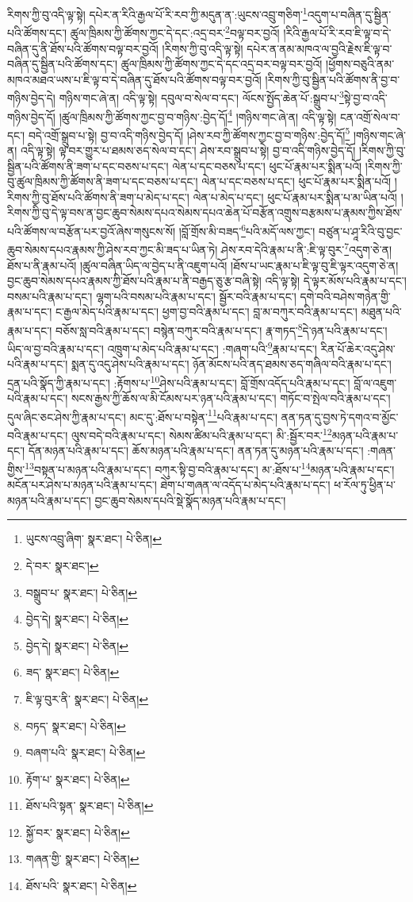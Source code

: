 རིགས་ཀྱི་བུ་འདི་ལྟ་སྟེ། དཔེར་ན་རིའི་རྒྱལ་པོ་རི་རབ་ཀྱི་མདུན་ན་:ཡུངས་འབྲུ་གཅིག་\footnote{ཡུངས་འབྲུ་ཞིག་  སྣར་ཐང་།  པེ་ཅིན། }འདུག་པ་བཞིན་དུ་སྦྱིན་པའི་ཚོགས་དང་། ཚུལ་ཁྲིམས་ཀྱི་ཚོགས་ཀྱང་དེ་དང་:འདྲ་བར་\footnote{དེ་བར་  སྣར་ཐང་། }བལྟ་བར་བྱའོ། །རིའི་རྒྱལ་པོ་རི་རབ་ཇི་ལྟ་བ་དེ་བཞིན་དུ་ནི་ཐོས་པའི་ཚོགས་བལྟ་བར་བྱའོ། །རིགས་ཀྱི་བུ་འདི་ལྟ་སྟེ། དཔེར་ན་ནམ་མཁའ་ལ་བྱའི་རྗེས་ཇི་ལྟ་བ་བཞིན་དུ་སྦྱིན་པའི་ཚོགས་དང་། ཚུལ་ཁྲིམས་ཀྱི་ཚོགས་ཀྱང་དེ་དང་འདྲ་བར་བལྟ་བར་བྱའོ། །ཕྱོགས་བཅུའི་ནམ་མཁའ་མཐའ་ཡས་པ་ཇི་ལྟ་བ་དེ་བཞིན་དུ་ཐོས་པའི་ཚོགས་བལྟ་བར་བྱའོ། །རིགས་ཀྱི་བུ་སྦྱིན་པའི་ཚོགས་ནི་བྱ་བ་གཉིས་བྱེད་དེ། གཉིས་གང་ཞེ་ན། འདི་ལྟ་སྟེ། དབུལ་བ་སེལ་བ་དང་། ལོངས་སྤྱོད་ཆེན་པོ་:སྒྲུབ་པ་\footnote{བསྒྲུབ་པ་  སྣར་ཐང་།  པེ་ཅིན། }སྟེ་བྱ་བ་འདི་གཉིས་བྱེད་དོ། །ཚུལ་ཁྲིམས་ཀྱི་ཚོགས་ཀྱང་བྱ་བ་གཉིས་:བྱེད་དོ།\footnote{བྱེད་དེ།  སྣར་ཐང་།  པེ་ཅིན། } །གཉིས་གང་ཞེ་ན། འདི་ལྟ་སྟེ། ངན་འགྲོ་སེལ་བ་དང་། བདེ་འགྲོ་སྒྲུབ་པ་སྟེ། བྱ་བ་འདི་གཉིས་བྱེད་དོ། །ཤེས་རབ་ཀྱི་ཚོགས་ཀྱང་བྱ་བ་གཉིས་:བྱེད་དོ།\footnote{བྱེད་དེ།  སྣར་ཐང་།  པེ་ཅིན། } །གཉིས་གང་ཞེ་ན། འདི་ལྟ་སྟེ། ལྟ་བར་གྱུར་པ་ཐམས་ཅད་སེལ་བ་དང་། ཤེས་རབ་སྒྲུབ་པ་སྟེ། བྱ་བ་འདི་གཉིས་བྱེད་དོ། །རིགས་ཀྱི་བུ་སྦྱིན་པའི་ཚོགས་ནི་ཟག་པ་དང་བཅས་པ་དང་། ལེན་པ་དང་བཅས་པ་དང་། ཕུང་པོ་རྣམ་པར་སྨིན་པའོ། །རིགས་ཀྱི་བུ་ཚུལ་ཁྲིམས་ཀྱི་ཚོགས་ནི་ཟག་པ་དང་བཅས་པ་དང་། ལེན་པ་དང་བཅས་པ་དང་། ཕུང་པོ་རྣམ་པར་སྨིན་པའོ། །རིགས་ཀྱི་བུ་ཐོས་པའི་ཚོགས་ནི་ཟག་པ་མེད་པ་དང་། ལེན་པ་མེད་པ་དང་། ཕུང་པོ་རྣམ་པར་སྨིན་པ་མ་ཡིན་པའོ། །རིགས་ཀྱི་བུ་དེ་ལྟ་བས་ན་བྱང་ཆུབ་སེམས་དཔའ་སེམས་དཔའ་ཆེན་པོ་བརྩོན་འགྲུས་བརྩམས་པ་རྣམས་ཀྱིས་ཐོས་པའི་ཚོགས་ལ་བརྩོན་པར་བྱའོ་ཞེས་གསུངས་སོ། །བློ་གྲོས་མི་བཟད་\footnote{ཟད་  སྣར་ཐང་།  པེ་ཅིན། }པའི་མདོ་ལས་ཀྱང་། བཙུན་པ་ཤཱ་རིའི་བུ་བྱང་ཆུབ་སེམས་དཔའ་རྣམས་ཀྱི་ཤེས་རབ་ཀྱང་མི་ཟད་པ་ཡིན་ཏེ། ཤེས་རབ་དེའི་རྣམ་པ་ནི་:ཇི་ལྟ་བུར་\footnote{ཇི་ལྟ་བུར་ནི་  སྣར་ཐང་།  པེ་ཅིན། }འདུག་ཅེ་ན། ཐོས་པ་ནི་རྣམ་པའོ། །ཚུལ་བཞིན་ཡིད་ལ་བྱེད་པ་ནི་འཇུག་པའོ། །ཐོས་པ་ཡང་རྣམ་པ་ཇི་ལྟ་བུ་ཇི་ལྟར་འདུག་ཅེ་ན། བྱང་ཆུབ་སེམས་དཔའ་རྣམས་ཀྱི་ཐོས་པའི་རྣམ་པ་ནི་བརྒྱད་ཅུ་རྩ་བཞི་སྟེ། འདི་ལྟ་སྟེ། དེ་ལྟར་མོས་པའི་རྣམ་པ་དང་། བསམ་པའི་རྣམ་པ་དང་། ལྷག་པའི་བསམ་པའི་རྣམ་པ་དང་། སྦྱོར་བའི་རྣམ་པ་དང་། དགེ་བའི་བཤེས་གཉེན་གྱི་རྣམ་པ་དང་། ང་རྒྱལ་མེད་པའི་རྣམ་པ་དང་། ཕྱག་བྱ་བའི་རྣམ་པ་དང་། བླ་མ་བཀུར་བའི་རྣམ་པ་དང་། མཐུན་པའི་རྣམ་པ་དང་། བཅོས་སླ་བའི་རྣམ་པ་དང་། བསྙེན་བཀུར་བའི་རྣམ་པ་དང་། རྣ་གཏད་\footnote{བཏད་  སྣར་ཐང་།  པེ་ཅིན། }དེ་ཉན་པའི་རྣམ་པ་དང་། ཡིད་ལ་བྱ་བའི་རྣམ་པ་དང་། འཁྲུག་པ་མེད་པའི་རྣམ་པ་དང་། :གཞག་པའི་\footnote{བཞག་པའི་  སྣར་ཐང་།  པེ་ཅིན། }རྣམ་པ་དང་། རིན་པོ་ཆེར་འདུ་ཤེས་པའི་རྣམ་པ་དང་། སྨན་དུ་འདུ་ཤེས་པའི་རྣམ་པ་དང་། ཉོན་མོངས་པའི་ནད་ཐམས་ཅད་གཞིལ་བའི་རྣམ་པ་དང་། དྲན་པའི་སྣོད་ཀྱི་རྣམ་པ་དང་། :རྟོགས་པ་\footnote{རྟོག་པ་  སྣར་ཐང་།  པེ་ཅིན། }ཤེས་པའི་རྣམ་པ་དང་། བློ་གྲོས་འདོད་པའི་རྣམ་པ་དང་། བློ་ལ་འཇུག་པའི་རྣམ་པ་དང་། སངས་རྒྱས་ཀྱི་ཆོས་ལ་མི་ངོམས་པར་ཉན་པའི་རྣམ་པ་དང་། གཏོང་བ་སྤེལ་བའི་རྣམ་པ་དང་། དུལ་ཞིང་ཅང་ཤེས་ཀྱི་རྣམ་པ་དང་། མང་དུ་:ཐོས་པ་བསྟེན་\footnote{ཐོས་པའི་སྟན་  སྣར་ཐང་།  པེ་ཅིན། }པའི་རྣམ་པ་དང་། ནན་ཏན་དུ་བྱས་ཏེ་དགའ་བ་མྱོང་བའི་རྣམ་པ་དང་། ལུས་བདེ་བའི་རྣམ་པ་དང་། སེམས་ཚིམ་པའི་རྣམ་པ་དང་། མི་:སྦྱོར་བར་\footnote{སྐྱོ་བར་  སྣར་ཐང་།  པེ་ཅིན། }མཉན་པའི་རྣམ་པ་དང་། དོན་མཉན་པའི་རྣམ་པ་དང་། ཆོས་མཉན་པའི་རྣམ་པ་དང་། ནན་ཏན་དུ་མཉན་པའི་རྣམ་པ་དང་། :གཞན་གྱིས་\footnote{གཞན་གྱི་  སྣར་ཐང་།  པེ་ཅིན། }བསྟན་པ་མཉན་པའི་རྣམ་པ་དང་། བཀུར་སྟི་བྱ་བའི་རྣམ་པ་དང་། མ་:ཐོས་པ་\footnote{ཐོས་པའི་  སྣར་ཐང་།  པེ་ཅིན། }མཉན་པའི་རྣམ་པ་དང་། མངོན་པར་ཤེས་པ་མཉན་པའི་རྣམ་པ་དང་། ཐེག་པ་གཞན་ལ་འདོད་པ་མེད་པའི་རྣམ་པ་དང་། ཕ་རོལ་ཏུ་ཕྱིན་པ་མཉན་པའི་རྣམ་པ་དང་། བྱང་ཆུབ་སེམས་དཔའི་སྡེ་སྣོད་མཉན་པའི་རྣམ་པ་དང་། 